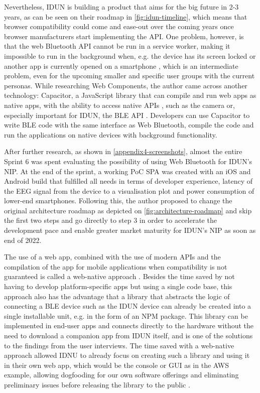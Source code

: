 Nevertheless, IDUN is building a product that aims for the big future in 2-3 years, as can be seen on their roadmap in \autoref{fig:idun-timeline}, which means that browser compatibility could come and ease-out over the coming years once browser manufacturers start implementing the API. One problem, however, is that the web Bluetooth API cannot be run in a service worker, making it impossible to run in the background when, e.g. the device has its screen locked or another app is currently opened on a smartphone \citep{webbluetoothcg_service_2018}, which is an intermediate problem, even for the upcoming smaller and specific user groups with the current personas. While researching Web Components, the author came across another technology: Capacitor, a JavaScript library that can compile and run web apps as native apps, with the ability to access native APIs \citep{ionic_capacitor_nodate}, such as the camera or, especially important for IDUN, the BLE API \citep{capacitor-community_capacitor-communitybluetooth-_2022}. Developers can use Capacitor to write BLE code with the same interface as Web Bluetooth, compile the code and run the applications on native devices with background functionality.

After further research, as shown in \autoref{appendix4-screenshots}, almost the entire Sprint 6 was spent evaluating the possibility of using Web Bluetooth for IDUN's NIP. At the end of the sprint, a working PoC SPA was created with an iOS and Android build that fulfilled all needs in terms of developer experience, latency of the EEG signal from the device to a visualisation plot and power consumption of lower-end smartphones. Following this, the author proposed to change the original architecture roadmap as depicted on \autoref{fig:architecture-roadmap} and skip the first two steps and go directly to step 3 in order to accelerate the development pace and enable greater market maturity for IDUN's NIP as soon as end of 2022.

The use of a web app, combined with the use of modern APIs and the compilation of the app for mobile applications when compatibility is not guaranteed is called a web-native approach \citep{ionic_web_nodate}. Besides the time saved by not having to develop platform-specific apps but using a single code base, this approach also has the advantage that a library that abstracts the logic of connecting a BLE device such as the IDUN device can already be created into a single installable unit, e.g. in the form of an NPM package. This library can be implemented in end-user apps and connects directly to the hardware without the need to download a companion app from IDUN itself, and is one of the solutions to the findings from the user interviews. The time saved with a web-native approach allowed IDNU to already focus on creating such a library and using it in their own web app, which would be the console or GUI as in the AWS example, allowing dogfooding for our own software offerings and eliminating preliminary issues before releasing the library to the public \citep{techopedia_what_2016}.

